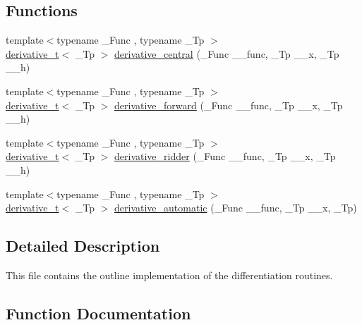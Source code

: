 \subsection*{Functions}
\begin{DoxyCompactItemize}
\item 
{\footnotesize template$<$typename \+\_\+\+Func , typename \+\_\+\+Tp $>$ }\\\hyperlink{structderivative__t}{derivative\+\_\+t}$<$ \+\_\+\+Tp $>$ \hyperlink{differentiation_8tcc_aef32000eba6743a6066fdd345ab72f17}{derivative\+\_\+central} (\+\_\+\+Func \+\_\+\+\_\+func, \+\_\+\+Tp \+\_\+\+\_\+x, \+\_\+\+Tp \+\_\+\+\_\+h)
\item 
{\footnotesize template$<$typename \+\_\+\+Func , typename \+\_\+\+Tp $>$ }\\\hyperlink{structderivative__t}{derivative\+\_\+t}$<$ \+\_\+\+Tp $>$ \hyperlink{differentiation_8tcc_ac1cc760446a1455c0e97fe098dde2bc7}{derivative\+\_\+forward} (\+\_\+\+Func \+\_\+\+\_\+func, \+\_\+\+Tp \+\_\+\+\_\+x, \+\_\+\+Tp \+\_\+\+\_\+h)
\item 
{\footnotesize template$<$typename \+\_\+\+Func , typename \+\_\+\+Tp $>$ }\\\hyperlink{structderivative__t}{derivative\+\_\+t}$<$ \+\_\+\+Tp $>$ \hyperlink{differentiation_8tcc_a3e9da1abac5e2d4a10e0eeca1812590d}{derivative\+\_\+ridder} (\+\_\+\+Func \+\_\+\+\_\+func, \+\_\+\+Tp \+\_\+\+\_\+x, \+\_\+\+Tp \+\_\+\+\_\+h)
\item 
{\footnotesize template$<$typename \+\_\+\+Func , typename \+\_\+\+Tp $>$ }\\\hyperlink{structderivative__t}{derivative\+\_\+t}$<$ \+\_\+\+Tp $>$ \hyperlink{differentiation_8tcc_adb69998cd2c44fb3f875be91939d61e4}{derivative\+\_\+automatic} (\+\_\+\+Func \+\_\+\+\_\+func, \+\_\+\+Tp \+\_\+\+\_\+x, \+\_\+\+Tp)
\end{DoxyCompactItemize}


\subsection{Detailed Description}
This file contains the outline implementation of the differentiation routines. 

\subsection{Function Documentation}
\mbox{\label{differentiation_8tcc_adb69998cd2c44fb3f875be91939d61e4}} 
